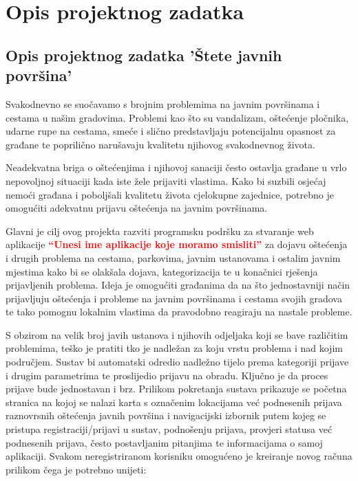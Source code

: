 \chapter{Opis projektnog zadatka}

\section{Opis projektnog zadatka 'Štete javnih površina'}

\noindent Svakodnevno se suočavamo s brojnim problemima na javnim površinama i cestama u našim gradovima. Problemi kao što su vandalizam, oštećenje pločnika, udarne rupe na cestama, smeće i slično predstavljaju potencijalnu opasnost za građane te poprilično narušavaju kvalitetu njihovog svakodnevnog života.

\noindent Neadekvatna briga o oštećenjima i njihovoj sanaciji često ostavlja građane u vrlo nepovoljnoj situaciji kada iste žele prijaviti vlastima. Kako bi suzbili osjećaj nemoći građana i poboljšali kvalitetu života cjelokupne zajednice, potrebno je omogućiti adekvatnu prijavu oštećenja na javnim površinama.

\noindent Glavni je cilj ovog projekta razviti programsku podršku za stvaranje web aplikacije
\textcolor{red}{\textbf{“Unesi ime aplikacije koje moramo smisliti”}} za dojavu oštećenja i drugih problema na cestama, parkovima, javnim ustanovama i ostalim javnim mjestima kako bi se olakšala dojava, kategorizacija te u konačnici rješenja prijavljenih problema. Ideja je omogućiti građanima da na što jednostavniji način prijavljuju oštećenja i probleme na javnim površinama i cestama svojih gradova te tako pomognu lokalnim vlastima da pravodobno reagiraju na nastale probleme.

\noindent S obzirom na velik broj javih ustanova i njihovih odjeljaka koji se bave različitim problemima, teško je pratiti tko je nadležan za koju vrstu problema i nad kojim područjem. Sustav bi automatski odredio nadležno tijelo prema kategoriji prijave i drugim parametrima te proslijedio prijavu na obradu. Ključno je da proces prijave bude jednostavan i brz.
\noindent Prilikom pokretanja sustava prikazuje se početna stranica na kojoj se nalazi karta s označenim lokacijama već podnesenih prijava raznovrsnih oštećenja javnih površina i navigacijski izbornik putem kojeg se pristupa registraciji/prijavi u sustav, podnošenju prijava, provjeri statusa već podnesenih prijava, često postavljanim pitanjima te informacijama o samoj aplikaciji.
\noindent Svakom neregistriranom korisniku omogućeno je kreiranje novog računa prilikom čega je potrebno unijeti:

